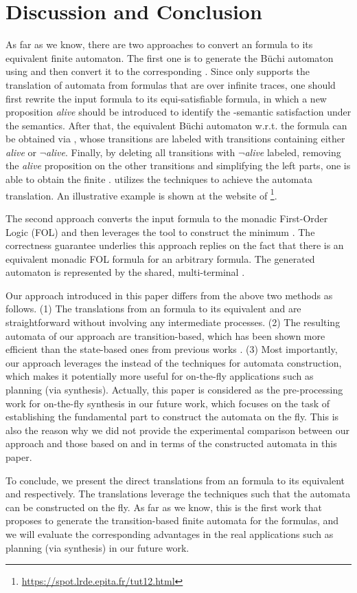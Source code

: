 \section{Discussion and Conclusion}\label{sec:discuss}
As far as we know, there are two approaches to convert an \ltlf formula to its equivalent finite automaton. The first one is to generate the B\"uchi automaton using \spot and then convert it to the corresponding \NFA. Since \spot only supports the translation of automata from \ltl formulas that are over infinite traces, one should first rewrite the input \ltlf formula to its equi-satisfiable \ltl formula, in which a new proposition \emph{alive} should be introduced to identify the \ltlf-semantic satisfaction under the \ltl semantics. After that, the equivalent B\"uchi automaton w.r.t. the \ltl formula can be obtained via \spot, whose transitions are labeled with transitions containing either \emph{alive} or \emph{$\neg$alive}. Finally, by deleting all transitions with \emph{$\neg$alive} labeled, removing the \emph{alive} proposition on the other transitions and simplifying the left parts, one is able to obtain the finite \NFA. \spot utilizes the \BDD techniques to achieve the automata translation. An illustrative example is shown at the website of \spot\footnote{\url{https://spot.lrde.epita.fr/tut12.html}}.

The second approach converts the input \ltlf formula to the monadic First-Order Logic (FOL) and then leverages the \mona tool \cite{EKM98} to construct the minimum \DFA \cite{ZTLPV17}. The correctness guarantee underlies this approach replies on the fact that there is an equivalent monadic FOL formula for an arbitrary \ltlf formula. The generated automaton is represented by the shared, multi-terminal \BDD. 

Our approach introduced in this paper differs from the above two methods as follows. (1) The translations from an \ltlf formula to its equivalent \TNFA and \TDFA are straightforward without involving any intermediate processes. (2) The resulting automata of our approach are transition-based, which has been shown more efficient than the state-based ones from previous works \cite{GL02}. (3) Most importantly, our approach leverages the \SAT instead of the \BDD techniques for automata construction, which makes it potentially more useful for on-the-fly applications such as planning (via synthesis). Actually, this paper is considered as the pre-processing work for \ltlf on-the-fly synthesis in our future work, which focuses on the task of establishing the fundamental part to construct the automata on the fly. This is also the reason why we did not provide the experimental comparison between our approach and those based on \spot and \mona in terms of the constructed automata in this paper.

To conclude, we present the direct translations from an \ltlf formula to its equivalent \TNFA and \TDFA respectively. The translations leverage the \SAT techniques such that the automata can be constructed on the fly. As far as we know, this is the first work that proposes to generate the transition-based finite automata for the \ltlf formulas, and we will evaluate the corresponding advantages in the real applications such as planning (via synthesis) in our future work. 
